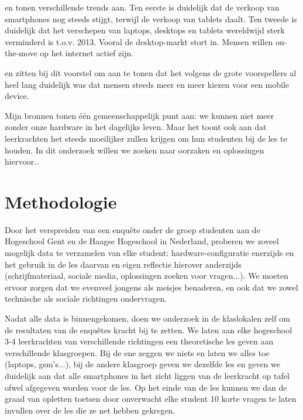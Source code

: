 \textcite{2} en \textcite{1} tonen verschillende trends aan. Ten eerste is duidelijk dat de verkoop van smartphones nog steeds stijgt, terwijl de verkoop van tablets daalt. Ten tweede is duidelijk dat het verschepen van laptops, desktops en tablets wereldwijd sterk verminderd is t.o.v. 2013. Vooral de desktop-markt stort in. Mensen willen on-the-move op het internet actief zijn.

\textcite{4} en \textcite{5} zitten bij dit voorstel om aan te tonen dat het volgens de grote voorspellers al heel lang duidelijk was dat mensen steeds meer en meer kiezen voor een mobile device. 

Mijn bronnen tonen één gemeenschappelijk punt aan: we kunnen niet meer zonder onze hardware in het dagelijks leven. Maar het toont ook aan dat leerkrachten het steeds moeilijker zullen krijgen om hun studenten bij de les te houden. In dit onderzoek willen we zoeken naar oorzaken en oplossingen hiervoor..

\section{Methodologie}
\label{sec:methodologie}

Door het verspreiden van een enquête onder de groep studenten aan de Hogeschool Gent en de Haagse Hogeschool in Nederland, proberen we zoveel mogelijk data te verzamelen van elke student: hardware-configuratie enerzijds en het gebruik in de les daarvan en eigen reflectie hierover anderzijds (schrijfmateriaal, sociale media, oplossingen zoeken voor vragen...). We moeten ervoor zorgen dat we evenveel jongens als meisjes benaderen, en ook dat we zowel technische als sociale richtingen ondervragen. 

Nadat alle data is binnengekomen, doen we onderzoek in de klaslokalen zelf om de resultaten van de enquêtes kracht bij te zetten. We laten aan elke hogeschool 3-4 leerkrachten van verschillende richtingen een theoretische les geven aan verschillende klasgroepen. Bij de ene zeggen we niets en laten we alles toe (laptops, gsm's...), bij de andere klasgroep geven we dezelfde les en geven we duidelijk aan dat alle smartphones in het zicht liggen van de leerkracht op tafel ofwel afgegeven worden voor de les. Op het einde van de les kunnen we dan de graad van opletten toetsen door onverwacht elke student 10 korte vragen te laten invullen over de les die ze net hebben gekregen.  

